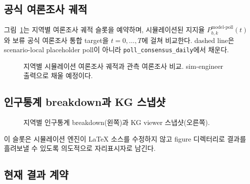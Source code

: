 \documentclass[11pt]{article}
\begin{document}
\subsection{공식 여론조사 궤적}

그림~\ref{fig:poll-traj}는 지역별 여론조사 궤적 슬롯을 예약하며, 시뮬레이션된 지지율 $P^{\text{model-poll}}_{b,k}(t)$와 보류 공식 여론조사 통합 target을 $t = 0, \dots, T$에 걸쳐 비교한다. dashed line은 scenario-local placeholder poll이 아니라 \texttt{poll\_consensus\_daily}에서 채운다.

\begin{figure}[h]
\centering
\caption{지역별 시뮬레이션 여론조사 궤적과 관측 여론조사 비교. sim-engineer 출력으로 채울 예정이다.}
\label{fig:poll-traj}
\end{figure}

\subsection{인구통계 breakdown과 KG 스냅샷}

\begin{figure}[h]
\centering
\hfill
\caption{지역별 인구통계 breakdown(왼쪽)과 KG viewer 스냅샷(오른쪽).}
\label{fig:demographics-kg}
\end{figure}

이 슬롯은 시뮬레이션 엔진이 LaTeX 소스를 수정하지 않고 figure 디렉터리로 결과를 흘려보낼 수 있도록 의도적으로 자리표시자로 남긴다.

\subsection{현재 결과 계약}
\end{document}
